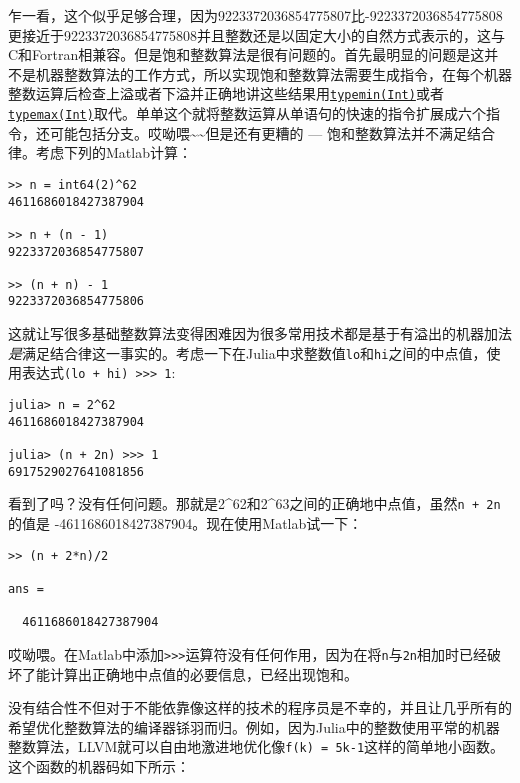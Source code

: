 乍一看，这个似乎足够合理，因为9223372036854775807比-9223372036854775808更接近于9223372036854775808并且整数还是以固定大小的自然方式表示的，这与C和Fortran相兼容。但是饱和整数算法是很有问题的。首先最明显的问题是这并不是机器整数算法的工作方式，所以实现饱和整数算法需要生成指令，在每个机器整数运算后检查上溢或者下溢并正确地讲这些结果用\hyperlink{3613894539247233488}{\texttt{typemin(Int)}}或者\hyperlink{17760305803764597758}{\texttt{typemax(Int)}}取代。单单这个就将整数运算从单语句的快速的指令扩展成六个指令，还可能包括分支。哎呦喂{\textasciitilde}{\textasciitilde}但是还有更糟的 — 饱和整数算法并不满足结合律。考虑下列的Matlab计算：




\begin{lstlisting}
>> n = int64(2)^62
4611686018427387904

>> n + (n - 1)
9223372036854775807

>> (n + n) - 1
9223372036854775806
\end{lstlisting}



这就让写很多基础整数算法变得困难因为很多常用技术都是基于有溢出的机器加法\emph{是}满足结合律这一事实的。考虑一下在Julia中求整数值\texttt{lo}和\texttt{hi}之间的中点值，使用表达式\texttt{(lo + hi) >>> 1}:




\begin{verbatim}
julia> n = 2^62
4611686018427387904

julia> (n + 2n) >>> 1
6917529027641081856
\end{verbatim}



看到了吗？没有任何问题。那就是2{\textasciicircum}62和2{\textasciicircum}63之间的正确地中点值，虽然\texttt{n + 2n}的值是 -4611686018427387904。现在使用Matlab试一下：




\begin{lstlisting}
>> (n + 2*n)/2

ans =

  4611686018427387904
\end{lstlisting}



哎呦喂。在Matlab中添加\texttt{>>>}运算符没有任何作用，因为在将\texttt{n}与\texttt{2n}相加时已经破坏了能计算出正确地中点值的必要信息，已经出现饱和。



没有结合性不但对于不能依靠像这样的技术的程序员是不幸的，并且让几乎所有的希望优化整数算法的编译器铩羽而归。例如，因为Julia中的整数使用平常的机器整数算法，LLVM就可以自由地激进地优化像\texttt{f(k) = 5k-1}这样的简单地小函数。这个函数的机器码如下所示：




